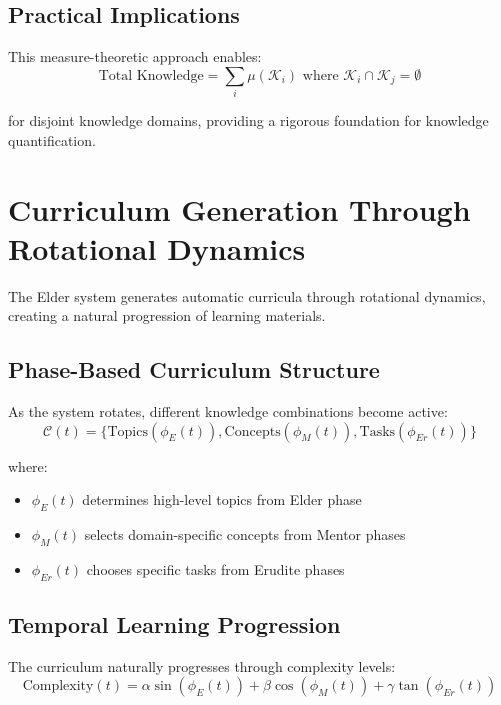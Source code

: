\subsection{Practical Implications}

This measure-theoretic approach enables:
\begin{equation}
\text{Total Knowledge} = \sum_{i} \mu(\mathcal{K}_i) \text{ where } \mathcal{K}_i \cap \mathcal{K}_j = \emptyset
\end{equation}

for disjoint knowledge domains, providing a rigorous foundation for knowledge quantification.

\section{Curriculum Generation Through Rotational Dynamics}

The Elder system generates automatic curricula through rotational dynamics, creating a natural progression of learning materials.

\subsection{Phase-Based Curriculum Structure}

As the system rotates, different knowledge combinations become active:
\begin{equation}
\mathcal{C}(t) = \{\text{Topics}(\phi_E(t)), \text{Concepts}(\phi_M(t)), \text{Tasks}(\phi_{Er}(t))\}
\end{equation}

where:
\begin{itemize}
    \item $\phi_E(t)$ determines high-level topics from Elder phase
    \item $\phi_M(t)$ selects domain-specific concepts from Mentor phases
    \item $\phi_{Er}(t)$ chooses specific tasks from Erudite phases
\end{itemize}

\subsection{Temporal Learning Progression}

The curriculum naturally progresses through complexity levels:
\begin{equation}
\text{Complexity}(t) = \alpha \sin(\phi_E(t)) + \beta \cos(\phi_M(t)) + \gamma \tan(\phi_{Er}(t))
\end{equation}


